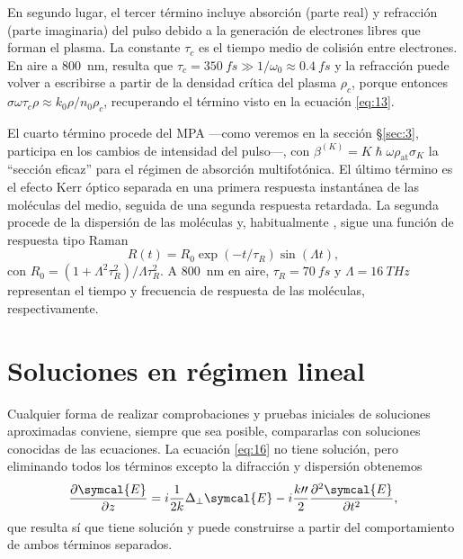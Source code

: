 \documentclass{scrartcl} %
\newcommand*{\pdv}[2]{\frac{\partial#1}{\partial#2}}
\newcommand*{\pdvN}[3]{\frac{\partial^{#3}#1}{\partial{#2}^{#3}}}
\newcommand*{\laplacian}{\Delta}
\begin{document}
En segundo lugar, el tercer término incluye absorción (parte real) y refracción (parte imaginaria) del pulso debido a la generación de electrones libres que forman el plasma. La constante $\tau_{c}$ es el tiempo medio de colisión entre electrones. En aire a \qty{800}{nm}, resulta que $\tau_{c} = \qty{350}{fs} \gg 1/\omega_{0} \approx \qty{0.4}{fs}$ \cite{Couairon2009} y la refracción puede volver a escribirse a partir de la densidad crítica del plasma $\rho_{c}$, porque entonces $\sigma \omega \tau_{c} \rho \approx k_{0} \rho/n_{0} \rho_{c}$, recuperando el término visto en la ecuación \eqref{eq:13}. 

El cuarto término procede del MPA ---como veremos en la sección \S\ref{sec:3}, participa en los cambios de intensidad del pulso---, con $\beta^{(K)} = K \hslash \omega \rho_{\mathrm{at}} \sigma_{K}$ la \enquote{sección eficaz} para el régimen de absorción multifotónica. El último término es el efecto Kerr óptico separada en una primera respuesta instantánea de las moléculas del medio, seguida de una segunda respuesta retardada. La segunda procede de la dispersión de las moléculas y, habitualmente \cite{Couairon2009,Couairon2006b,Couairon2007}, sigue una función de respuesta tipo Raman 
\begin{equation}\label{eq:17}
  R(t) = R_{0}\exp(-t/\tau_{R})\sin(\Lambda t),
\end{equation}
con $R_{0} = (1 + \Lambda^{2} \tau^{2}_{R})/\Lambda\tau^{2}_{R}$. A \qty{800}{nm} en aire, $\tau_{R} = \qty{70}{fs}$ y $\Lambda = \qty{16}{THz}$ representan el tiempo y frecuencia de respuesta de las moléculas, respectivamente.

\section{Soluciones en régimen lineal}\label{sec:2}
Cualquier forma de realizar comprobaciones y pruebas iniciales de soluciones aproximadas conviene, siempre que sea posible, compararlas con soluciones conocidas de las ecuaciones. La ecuación \eqref{eq:16} no tiene solución, pero eliminando todos los términos excepto la difracción y dispersión obtenemos
\begin{equation}\label{eq:18}
  \pdv{\symcal{E}}{z} = i \frac{1}{2k} \laplacian_{\perp} \symcal{E} - i \frac{k \prime \prime }{2}\pdvN{\symcal{E}}{t}{2},
\end{equation}
que resulta sí que tiene solución y puede construirse a partir del comportamiento de ambos términos separados.
\end{document}
